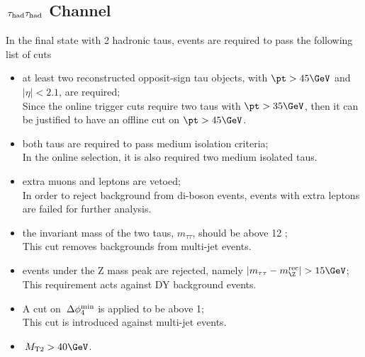 \subsection{\texorpdfstring{$\,\tau_{\rm had}\tau_{\rm had}$ Channel}{tau-tau Channel}}
\label{sect:tauTauCuts}
In the final state with 2 hadronic taus, events are required to pass the following list of cuts
\begin{itemize}
\item at least two reconstructed opposit-sign tau objects, with $\pt>45\GeV$ and $|\eta|<2.1$, are required;\\ Since the online trigger cuts require two taus with $\pt>35\GeV$, then it can be justified to have an offline cut on $\pt>45\GeV$. 
\item both taus are required to pass medium isolation criteria;\\ In the online selection, it is also required two medium isolated taus.
\item extra muons and leptons are vetoed;\\ In order to reject background from di-boson events, events with extra leptons are failed for further analysis.
\item the invariant mass of the two taus, $m_{\tau\tau}$, should be above 12 \GeV;\\ This cut removes backgrounds from multi-jet events. 
\item events under the Z mass peak are rejected, namely $|m_{\tau\tau}-m_{\Z}^{\rm rec}|>15\GeV$;\\ This requirement acts against DY background events. 
\item A cut on $\,{\Delta\phi_{4}^{\rm min}}$ is applied to be above 1;\\ This cut is introduced against multi-jet events.   
\item $\mttwo>40\GeV$. 
\end{itemize}
